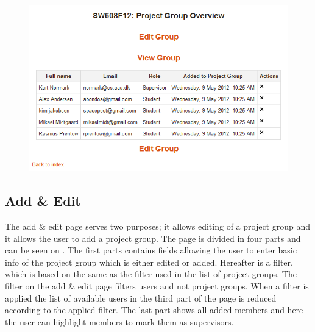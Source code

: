 \begin{figure}
	\centering
		\includegraphics[width=\textwidth]{images/moodleprojectgroupoverview.png}
	\label{fig:moodleprojectgroupoverview}
\end{figure}
\FloatBarrier

\subsection{Add \& Edit}
\label{sec:addandedit}
The add \& edit page serves two purposes; it allows editing of a project group and it allows the user to add a project group.
The page is divided in four parts and can be seen on . 
The first parts contains fields allowing the user to enter basic info of the project group which is either edited or added. 
Hereafter is a filter, which is based on the same as the filter used in the list of project groups. 
The filter on the add \& edit page filters users and not project groups. 
When a filter is applied the list of available users in the third part of the page is reduced according to the applied filter. 
The last part shows all added members and here the user can highlight members to mark them as supervisors. 


